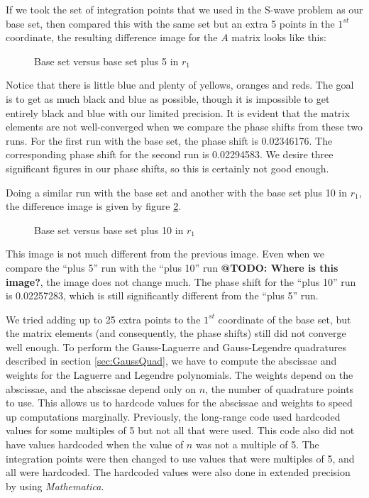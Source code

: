 \documentclass[Dissertation.tex]{subfiles}
\begin{document}
If we took the set of integration points that we used in the S-wave problem as our base set, then compared this with the same set but an extra 5 points in the $1^{st}$ coordinate, the resulting difference image for the $A$ matrix looks like this:
\begin{figure}[H]
	\centering
	\caption{Base set versus base set plus 5 in $r_1$}
	\label{fig:BasevsBaseplus5}
\end{figure}
\noindent Notice that there is little blue and plenty of yellows, oranges and reds. The goal is to get as much black and blue as possible, though it is impossible to get entirely black and blue with our limited precision. It is evident that the matrix elements are not well-converged when we compare the phase shifts from these two runs. For the first run with the base set, the phase shift is 0.02346176. The corresponding phase shift for the second run is 0.02294583. We desire three significant figures in our phase shifts, so this is certainly not good enough.

Doing a similar run with the base set and another with the base set plus 10 in $r_1$, the difference image is given by figure \ref{fig:BasevsBaseplus10}.
\begin{figure}[H]
	\centering
	\caption{Base set versus base set plus 10 in $r_1$}
	\label{fig:BasevsBaseplus10}
\end{figure}
\noindent This image is not much different from the previous image. Even when we compare the ``plus 5'' run with the ``plus 10'' run \textbf{@TODO: Where is this image?}, the image does not change much. The phase shift for the ``plus 10'' run is 0.02257283, which is still significantly different from the ``plus 5'' run.

We tried adding up to 25 extra points to the $1^{st}$ coordinate of the base set, but the matrix elements (and consequently, the phase shifts) still did not converge well enough. To perform the Gauss-Laguerre and Gauss-Legendre quadratures described in section \ref{sec:GaussQuad}, we have to compute the abscissae and weights for the Laguerre and Legendre polynomials. The weights depend on the abscissae, and the abscissae depend only on $n$, the number of quadrature points to use. This allows us to hardcode values for the abscissae and weights to speed up computations marginally. Previously, the long-range code used hardcoded values for some multiples of 5 but not all that were used. This code also did not have values hardcoded when the value of $n$ was not a multiple of 5. The integration points were then changed to use values that were multiples of 5, and all were hardcoded. The hardcoded values were also done in extended precision by using \emph{Mathematica}.
\end{document}

